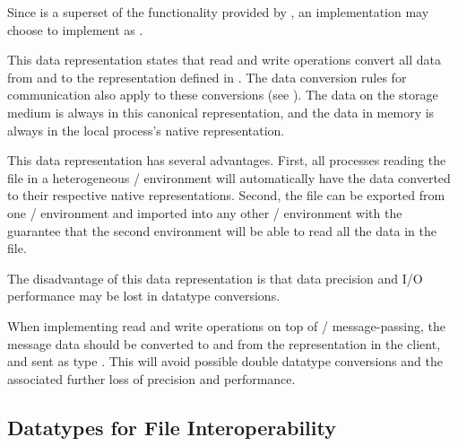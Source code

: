 \begin{description}
\begin{implementors}
Since  is a superset of the
functionality provided by ,
an implementation may choose to implement 
as .
\end{implementors}

\item[\mpistringmain{external32}:]
%
This data representation states that read and write operations
convert all data from
and to the 
representation defined in .
The data conversion rules for communication also apply to these
conversions (see ).
The data on the storage
medium is always in this canonical representation, and
the data in memory
is always in the local process's native representation.

This data representation has several advantages.
First, all processes reading the
file in a heterogeneous \MPI/ environment will automatically have the
data converted to their respective native representations.
Second, the file can be exported from one \MPI/ environment
and imported into any other \MPI/ environment
with the guarantee that the second environment will be able
to read all the data in the file.

The disadvantage of this data representation is that data precision and I/O
performance may be lost in datatype conversions.

\begin{implementors}
When implementing read and write operations
on top of \MPI/ message-passing, the message data should be converted
to and from the  representation in the client,
and sent as type .
This will avoid possible double datatype conversions
and the associated further loss of precision and performance.
\end{implementors}

\end{description}

\subsection{Datatypes for File Interoperability}
\label{subsec:io-interop}

